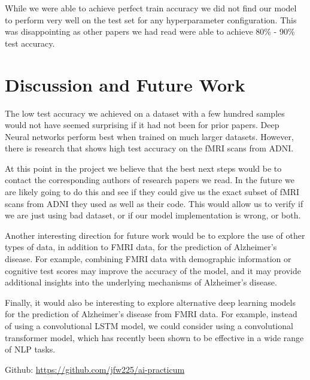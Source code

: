 \documentclass[11pt]{article}
\begin{document}
	While we were able to achieve perfect train accuracy we did not find our model to perform very well on the test set for any hyperparameter configuration. This was disappointing as other papers we had read were able to achieve 80\% - 90\% test accuracy. 

	\section{Discussion and Future Work}

	The low test accuracy we achieved on a dataset with a few hundred samples would not have seemed surprising if it had not been for prior papers. Deep Neural networks perform best when trained on much larger datasets. However, there is research that shows high test accuracy on the fMRI scans from ADNI.  

	At this point in the project we believe that the best next steps would be to contact the corresponding authors of research papers we read. In the future we are likely going to do this and see if they could give us the exact subset of fMRI scans from ADNI they used as well as their code. This would allow us to verify if we are just using bad dataset, or if our model implementation is wrong, or both. 

	Another interesting direction for future work would be to explore the use of other types of data, in addition to FMRI data, for the prediction of Alzheimer's disease. For example, combining FMRI data with demographic information or cognitive test scores may improve the accuracy of the model, and it may provide additional insights into the underlying mechanisms of Alzheimer's disease.

	Finally, it would also be interesting to explore alternative deep learning models for the prediction of Alzheimer's disease from FMRI data. For example, instead of using a convolutional LSTM model, we could consider using a convolutional transformer model, which has recently been shown to be effective in a wide range of NLP tasks.


	\newpage

	Github: \url{https://github.com/jfw225/ai-practicum}

	
	
\end{document}
